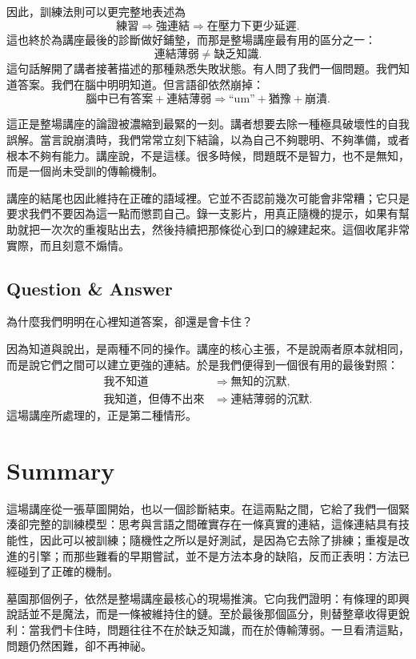 因此，訓練法則可以更完整地表述為
\begin{equation}
\text{練習} \Longrightarrow \text{強連結} \Longrightarrow \text{在壓力下更少延遲}.
\end{equation}
這也終於為講座最後的診斷做好鋪墊，而那是整場講座最有用的區分之一：
\begin{equation}
\text{連結薄弱} \neq \text{缺乏知識}.
\end{equation}
這句話解開了講者接著描述的那種熟悉失敗狀態。有人問了我們一個問題。我們知道答案。我們在腦中明明知道。但言語卻依然崩掉：
\begin{equation}
\text{腦中已有答案} + \text{連結薄弱} \Longrightarrow \text{``um''} + \text{猶豫} + \text{崩潰}.
\end{equation}

這正是整場講座的論證被濃縮到最緊的一刻。講者想要去除一種極具破壞性的自我誤解。當言說崩潰時，我們常常立刻下結論，以為自己不夠聰明、不夠準備，或者根本不夠有能力。講座說，不是這樣。很多時候，問題既不是智力，也不是無知，而是一個尚未受訓的傳輸機制。

講座的結尾也因此維持在正確的語域裡。它並不否認前幾次可能會非常糟；它只是要求我們不要因為這一點而懲罰自己。錄一支影片，用真正隨機的提示，如果有幫助就把一次次的重複貼出去，然後持續把那條從心到口的線建起來。這個收尾非常實際，而且刻意不煽情。

\subsection{Question \& Answer}

為什麼我們明明在心裡知道答案，卻還是會卡住？

因為知道與說出，是兩種不同的操作。講座的核心主張，不是說兩者原本就相同，而是說它們之間可以建立更強的連結。於是我們便得到一個很有用的最後對照：
\begin{align}
\text{我不知道} &\Longrightarrow \text{無知的沉默},\\
\text{我知道，但傳不出來} &\Longrightarrow \text{連結薄弱的沉默}.
\end{align}
這場講座所處理的，正是第二種情形。

\section{Summary}

這場講座從一張草圖開始，也以一個診斷結束。在這兩點之間，它給了我們一個緊湊卻完整的訓練模型：思考與言語之間確實存在一條真實的連結，這條連結具有技能性，因此可以被訓練；隨機性之所以是好測試，是因為它去除了排練；重複是改進的引擎；而那些難看的早期嘗試，並不是方法本身的缺陷，反而正表明：方法已經碰到了正確的機制。

墓園那個例子，依然是整場講座最核心的現場推演。它向我們證明：有條理的即興說話並不是魔法，而是一條被維持住的鏈。至於最後那個區分，則替整章收得更銳利：當我們卡住時，問題往往不在於缺乏知識，而在於傳輸薄弱。一旦看清這點，問題仍然困難，卻不再神祕。